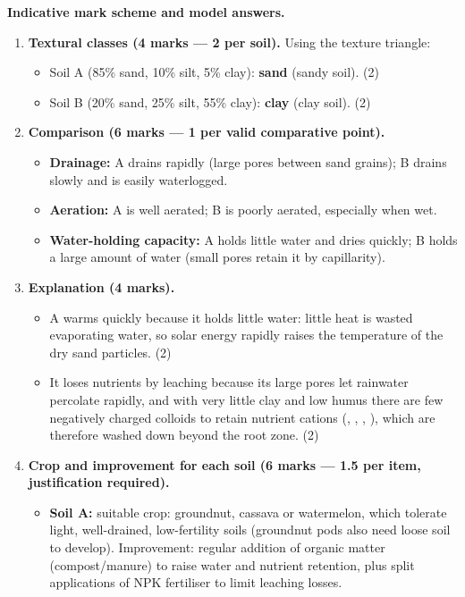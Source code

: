 \documentclass[11pt]{article}
\begin{document}
\begin{corrige}
\textbf{Indicative mark scheme and model answers.}
\begin{enumerate}
\item \textbf{Textural classes (4 marks — 2 per soil).} Using the texture triangle:
\begin{itemize}
\item Soil A (85\% sand, 10\% silt, 5\% clay): \textbf{sand} (sandy soil). \hfill (2)
\item Soil B (20\% sand, 25\% silt, 55\% clay): \textbf{clay} (clay soil). \hfill (2)
\end{itemize}
\item \textbf{Comparison (6 marks — 1 per valid comparative point).}
\begin{itemize}
\item \textbf{Drainage:} A drains rapidly (large pores between sand grains); B drains slowly and is easily waterlogged.
\item \textbf{Aeration:} A is well aerated; B is poorly aerated, especially when wet.
\item \textbf{Water-holding capacity:} A holds little water and dries quickly; B holds a large amount of water (small pores retain it by capillarity).
\end{itemize}
\item \textbf{Explanation (4 marks).}
\begin{itemize}
\item A warms quickly because it holds little water: little heat is wasted evaporating water, so solar energy rapidly raises the temperature of the dry sand particles. \hfill (2)
\item It loses nutrients by leaching because its large pores let rainwater percolate rapidly, and with very little clay and low humus there are few negatively charged colloids to retain nutrient cations (, , , ), which are therefore washed down beyond the root zone. \hfill (2)
\end{itemize}
\item \textbf{Crop and improvement for each soil (6 marks — 1.5 per item, justification required).}
\begin{itemize}
\item \textbf{Soil A:} suitable crop: groundnut, cassava or watermelon, which tolerate light, well-drained, low-fertility soils (groundnut pods also need loose soil to develop). Improvement: regular addition of organic matter (compost/manure) to raise water and nutrient retention, plus split applications of NPK fertiliser to limit leaching losses.

\end{itemize}
\end{enumerate}
\end{corrige}
\end{document}
